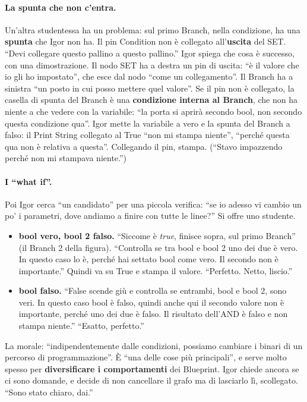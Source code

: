 \paragraph{La spunta che non c'entra.} Un'altra studentessa ha un problema: sul primo
Branch, nella condizione, ha una \textbf{spunta} che Igor non ha. Il pin Condition non è
collegato all'\textbf{uscita} del SET. ``Devi collegare questo pallino a questo
pallino.'' Igor spiega che cosa è successo, con una dimostrazione. Il nodo SET ha a
destra un pin di uscita: ``è il valore che io gli ho impostato'', che esce dal nodo
``come un collegamento''. Il Branch ha a sinistra ``un posto in cui posso mettere quel
valore''. Se il pin non è collegato, la casella di spunta del Branch è una
\textbf{condizione interna al Branch}, che non ha niente a che vedere con la variabile:
``la porta si aprirà secondo bool, non secondo questa condizione qua''. Igor mette la
variabile a vero e la spunta del Branch a falso: il Print String collegato al True
``non mi stampa niente'', ``perché questa qua non è relativa a questa''. Collegando il
pin, stampa. (``Stavo impazzendo perché non mi stampava niente.'')

\paragraph{I ``what if''.} Poi Igor cerca ``un candidato'' per una piccola verifica:
``se io adesso vi cambio un po' i parametri, dove andiamo a finire con tutte le linee?''
Si offre uno studente.
\begin{itemize}
  \item \textbf{bool vero, bool 2 falso.} ``Siccome è \emph{true}, finisce sopra, sul
        primo Branch'' (il Branch 2 della figura). ``Controlla se tra bool e bool 2 uno
        dei due è vero. In questo caso lo è, perché hai settato bool come vero. Il
        secondo non è importante.'' Quindi va su True e stampa il valore. ``Perfetto.
        Netto, liscio.''
  \item \textbf{bool falso.} ``False scende giù e controlla se entrambi, bool e bool 2,
        sono veri. In questo caso bool è falso, quindi anche qui il secondo valore non
        è importante, perché uno dei due è falso. Il risultato dell'AND è falso e non
        stampa niente.'' ``Esatto, perfetto.''
\end{itemize}
La morale: ``indipendentemente dalle condizioni, possiamo cambiare i binari di un
percorso di programmazione''. È ``una delle cose più principali'', e serve molto spesso
per \textbf{diversificare i comportamenti} dei Blueprint. Igor chiede ancora se ci sono
domande, e decide di non cancellare il grafo ma di lasciarlo lì, scollegato. ``Sono stato
chiaro, dai.''

